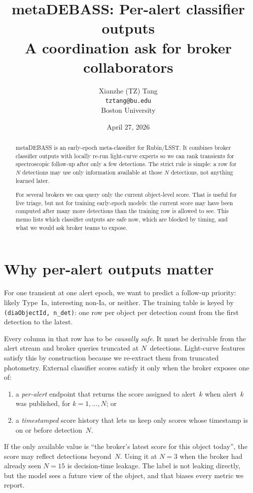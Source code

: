 \documentclass[11pt]{article}
\title{metaDEBASS: Per-alert classifier outputs\\
\large A coordination ask for broker collaborators}
\author{Xianzhe (TZ) Tang \\ \texttt{tztang@bu.edu} \\ Boston University}
\date{April 27, 2026}
\newcommand{\code}[1]{\texttt{#1}}
\begin{document}
\maketitle

\begin{abstract}
\noindent
metaDEBASS is an early-epoch meta-classifier for
Rubin/LSST. It combines broker classifier outputs with locally re-run
light-curve experts so we can rank transients for spectroscopic
follow-up after only a few detections. The strict rule is simple: a row
for $N$ detections may use only information available at those
$N$ detections, not anything learned later.

For several brokers we can query only the current object-level score.
That is useful for live triage, but not for training early-epoch models:
the current score may have been computed after many more detections than
the training row is allowed to see. This memo lists which classifier
outputs are safe now, which are blocked by timing, and what we would ask
broker teams to expose.
\end{abstract}

\section{Why per-alert outputs matter}

For one transient at one alert epoch, we want to predict a follow-up
priority: likely Type~Ia, interesting non-Ia, or neither. The training
table is keyed by \code{(diaObjectId, n\_det)}: one row per object per
detection count from the first detection to the latest.

Every column in that row has to be \emph{causally safe}. It must be
derivable from the alert stream and broker queries truncated at
$N$~detections. Light-curve features satisfy this by construction
because we re-extract them from truncated photometry. External
classifier scores satisfy it only when the broker exposes one of:

\begin{enumerate}
  \item a \emph{per-alert} endpoint that returns the score assigned to
    alert~$k$ when alert~$k$ was published, for $k=1,\dots,N$; or
  \item a \emph{timestamped} score history that lets us keep only scores
    whose timestamp is on or before detection~$N$.
\end{enumerate}

If the only available value is ``the broker's latest score for this
object today'', the score may reflect detections beyond~$N$. Using it at
$N=3$ when the broker had already seen $N=15$ is decision-time leakage.
The label is not leaking directly, but the model sees a future view of
the object, and that biases every metric we report.
\end{document}
